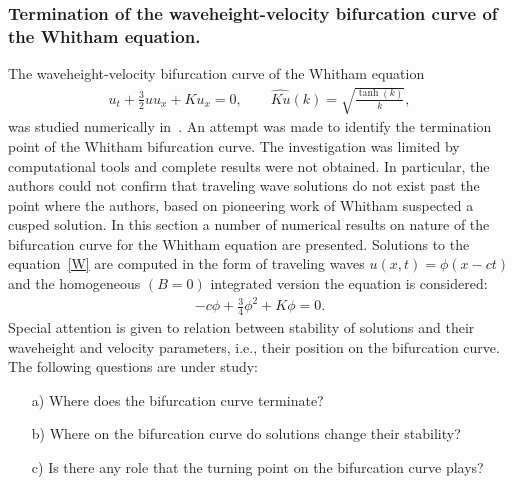 \subsubsection{Termination of the waveheight-velocity bifurcation curve of the Whitham equation.}
\label{sec-W-term}
The waveheight-velocity bifurcation curve of the Whitham equation 
\begin{align}
	u_t + \frac{3}{2} u u_x + Ku_x = 0, \qquad 
	\widehat{Ku}(k) = \sqrt{\frac{\tanh(k)}{k}},  \label{W}
\end{align}
was studied numerically in~\cite{Ehrnstrom2013}. 	
An attempt was made to identify the termination point of the Whitham bifurcation curve. 
The investigation was limited by computational tools and complete results were not obtained. 
In particular, the authors could not confirm that traveling wave solutions do not exist 
past the point where the authors, based on pioneering work of Whitham
\cite{Whitham1967j} suspected a cusped solution.
In this section a number of numerical results on nature of the bifurcation curve
for the Whitham equation are presented.
Solutions to the equation~\eqref{W}
are computed in the form of traveling waves $u(x,t) = \phi(x - c t)$
and the homogeneous $(B = 0)$ integrated version the equation is considered:
\begin{align}
-c \phi + \frac{3}{4} \phi^2 + K \phi = 0. \label{W-int}
\end{align}
Special attention is given to relation between stability of solutions 
and their waveheight and velocity parameters, i.e., their position on the bifurcation curve. 
The following questions are under study: 
\begin{itemize} %
\item[a)] Where does the bifurcation curve terminate?

\item[b)] Where on the bifurcation curve do solutions change their stability?

\item[c)] Is there any role that the turning point on the bifurcation curve plays?
\end{itemize}


